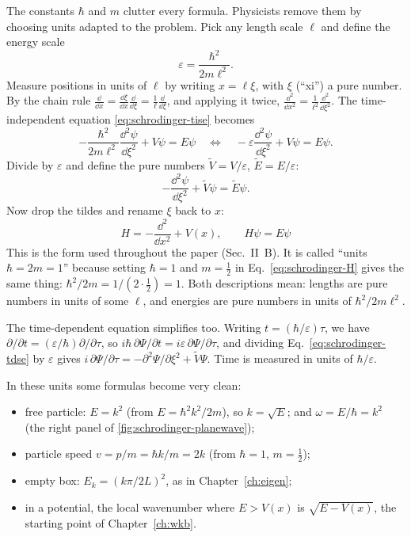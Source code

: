 The constants $\hbar$ and $m$ clutter every formula. Physicists remove them by choosing units adapted to the problem. Pick any length scale $\ell$ and define the energy scale
\begin{equation}
\varepsilon=\frac{\hbar^2}{2m\ell^2}.
\label{eq:schrodinger-epsilon}
\end{equation}
Measure positions in units of $\ell$ by writing $x=\ell\xi$, with $\xi$ (``xi'') a pure number. By the chain rule $\frac{\dd}{\dd x}=\frac{\dd\xi}{\dd x}\frac{\dd}{\dd\xi}=\frac1\ell\frac{\dd}{\dd\xi}$, and applying it twice, $\frac{\dd^2}{\dd x^2}=\frac1{\ell^2}\frac{\dd^2}{\dd\xi^2}$. The time-independent equation \eqref{eq:schrodinger-tise} becomes
\[
-\frac{\hbar^2}{2m\ell^2}\frac{\dd^2\psi}{\dd\xi^2}+V\psi=E\psi
\quad\Longleftrightarrow\quad
-\varepsilon\frac{\dd^2\psi}{\dd\xi^2}+V\psi=E\psi.
\]
Divide by $\varepsilon$ and define the pure numbers $\tilde V=V/\varepsilon$, $\tilde E=E/\varepsilon$:
\[
-\frac{\dd^2\psi}{\dd\xi^2}+\tilde V\psi=\tilde E\psi.
\]
Now drop the tildes and rename $\xi$ back to $x$:
\begin{equation}
\boxed{\;H=-\frac{\dd^2}{\dd x^2}+V(x),\qquad H\psi=E\psi\;}
\label{eq:schrodinger-units-H}
\end{equation}
This is the form used throughout the paper (Sec.~II~B). It is called ``units $\hbar=2m=1$'' because setting $\hbar=1$ and $m=\tfrac12$ in Eq.~\eqref{eq:schrodinger-H} gives the same thing: $\hbar^2/2m=1/(2\cdot\tfrac12)=1$. Both descriptions mean: lengths are pure numbers in units of some $\ell$, and energies are pure numbers in units of $\hbar^2/2m\ell^2$.

The time-dependent equation simplifies too. Writing $t=(\hbar/\varepsilon)\tau$, we have $\partial/\partial t=(\varepsilon/\hbar)\partial/\partial\tau$, so $i\hbar\,\partial\Psi/\partial t=i\varepsilon\,\partial\Psi/\partial\tau$, and dividing Eq.~\eqref{eq:schrodinger-tdse} by $\varepsilon$ gives $i\,\partial\Psi/\partial\tau=-\partial^2\Psi/\partial\xi^2+\tilde V\Psi$. Time is measured in units of $\hbar/\varepsilon$.

In these units some formulas become very clean:
\begin{itemize}
\item free particle: $E=k^2$ (from $E=\hbar^2k^2/2m$), so $k=\sqrt E$; and $\omega=E/\hbar=k^2$ (the right panel of \cref{fig:schrodinger-planewave});
\item particle speed $v=p/m=\hbar k/m=2k$ (from $\hbar=1$, $m=\tfrac12$);
\item empty box: $E_k=(k\pi/2L)^2$, as in Chapter~\ref{ch:eigen};
\item in a potential, the local wavenumber where $E>V(x)$ is $\sqrt{E-V(x)}$, the starting point of Chapter~\ref{ch:wkb}.
\end{itemize}

